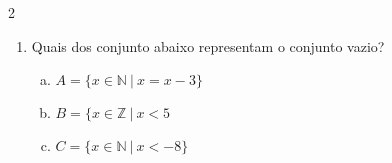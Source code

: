 \documentclass[a4paper,14pt]{article}
\begin{document}
\begin{multicols}{2}
\begin{enumerate}
\begin{enumerate}[a)]
    				\item $A = \{10, 12, 14, 16\}$ \\\\\\\\
    				\item $A = \{1, 2, 3, 4\}$ \\\\\\\\\\\\
    				\item $A = \{15, 17, 19\}$ \\\\\\\\\\\\
    				\item $A = \{29, 30, 31, 32\}$ \\\\\\\\\\\\
    				\item $A = \{7\}$ \\\\\\\\\\\\
    				\item $A = \varnothing$ \\\\\\\\\\\\\\\\\\\\\\
    			\end{enumerate}
    			\item Quais dos conjunto abaixo representam o conjunto vazio?
    			\begin{enumerate}[a)]
    				\item $A = \{x \in \mathbb{N}~|~x = x - 3\}$
    				\item $B = \{x \in \mathbb{Z}~|~x < 5$
    				\item $C = \{x \in \mathbb{N}~|~x < -8\}$

\end{enumerate}
\end{enumerate}
\end{multicols}
\end{document}
